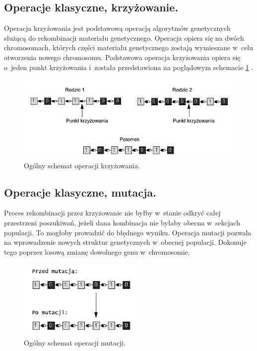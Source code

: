\documentclass[twoside,12pt]{report}
\begin{document}
\subsection{Operacje klasyczne, krzyżowanie.}

Operacja krzyżowania jest podstawową operacją algorytmów genetycznych służącą do rekombinacji materiału genetycznego. Operacja opiera się na dwóch chromosomach, których części materiału genetycznego zostają wymieszane w~celu otworzenia nowego chromosomu. Podstawowa operacja krzyżowania opiera się o~jeden punkt krzyżowania i~została przedstawiona na poglądowym schemacie \ref{krzyzowanie} \cite{gene mutikrzyz}.

\begin{figure}[ht]
\begin{center}
\includegraphics[width=\textwidth]{img/crossover}
\caption{Ogólny schemat operacji krzyżowania.}
\label{krzyzowanie}
\end{center}
\end{figure}

\subsection{Operacje klasyczne, mutacja.}

Proces rekombinacji przez krzyżowanie nie byłby w~stanie odkryć całej przestrzeni poszukiwań, jeżeli dana kombinacja nie byłaby obecna w~sekcjach populacji. To mogłoby prowadzić do błędnego wyniku. Operacja mutacji pozwala na wprowadzenie nowych struktur genetycznych w~obecnej populacji. Dokonuje tego poprzez losową zmianę dowolnego genu w~chromosomie\cite{gene mutikrzyz}.

\begin{figure}[ht]
\begin{center}
\includegraphics[width=0.55\textwidth]{img/mutation}
\caption{Ogólny schemat operacji mutacji.}
\end{center}
\end{figure}
\end{document}
